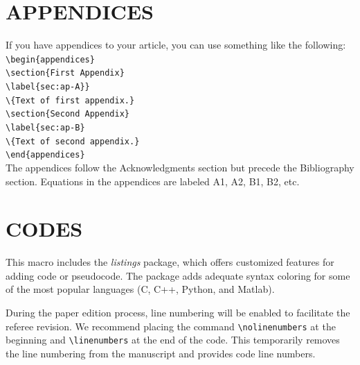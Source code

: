 \documentclass[9pt,twoside]{rmaa-rho-class/rmaa-rho}
\newcommand{\CS}[1]{\texttt{\textbackslash #1}}
\begin{document}
\section{APPENDICES}

If you have appendices to your article, you can use something like the following:\\
    
    \noindent\CS{begin}\verb|{appendices}|\\
    \CS{section}\verb|{First Appendix}|\\
    \CS{label}\verb|{sec:ap-A}}|\\
    \CS{}\verb|{Text of first appendix.}|\\
    \CS{section}\verb|{Second Appendix}|\\
    \CS{label}\verb|{sec:ap-B}|\\
    \CS{}\verb|{Text of second appendix.}|\\
    \CS{end}\verb|{appendices}|\\

The appendices follow the Acknowledgments section but precede the Bibliography section. Equations in the appendices are labeled A1, A2, B1, B2, etc.

\section{CODES}

    This macro includes the \textit{listings} package, which offers customized features for adding code or pseudocode. The package adds adequate syntax coloring for some of the most popular languages (C, C++, Python, 
    and Matlab).

    \nolinenumbers
    
    \linenumbers

\vspace{2cm}

    \nolinenumbers
    
    \linenumbers



    \nolinenumbers
    
    \linenumbers

    During the paper edition process, line numbering will be enabled to facilitate the referee revision. We recommend placing the command \verb|\nolinenumbers| at the beginning and \verb|\linenumbers| at the end of the code. This temporarily removes the line numbering from the manuscript and provides code line numbers.
\end{document}
